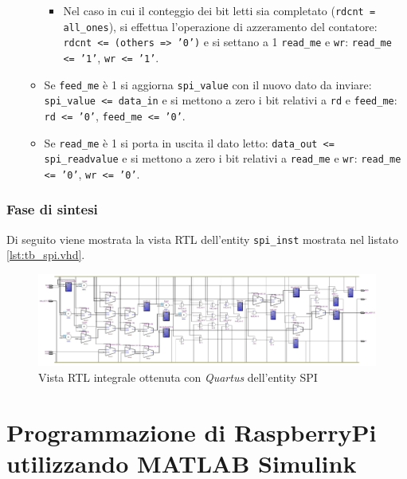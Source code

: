 \documentclass[titlepage]{report}
\begin{document}
\begin{itemize}
\begin{itemize}
\begin{itemize}
						\item Nel caso in cui il conteggio dei bit letti sia completato (\texttt{rdcnt = all\_ones}), si effettua l'operazione di azzeramento del contatore: \texttt{rdcnt <= (others => '0')} e si settano a 1 \texttt{read\_me} e \texttt{wr}: \texttt{read\_me <= '1'}, \texttt{wr <= '1'}.
					\end{itemize}
					\item Se \texttt{feed\_me} è 1 si aggiorna \texttt{spi\_value} con il nuovo dato da inviare: \texttt{spi\_value <= data\_in} e si mettono a zero i bit relativi a \texttt{rd} e \texttt{feed\_me}: \texttt{rd <= '0'}, \texttt{feed\_me <= '0'}.
					\item Se \texttt{read\_me} è 1 si porta in uscita il dato letto: \texttt{data\_out <= spi\_readvalue} e si mettono a zero i bit relativi a \texttt{read\_me} e \texttt{wr}: \texttt{read\_me <= '0'}, \texttt{wr <= '0'}.
				\end{itemize}
			\end{itemize}

		\subsection*{Fase di sintesi}
		\label{subsec:spi_sintesi}
			Di seguito viene mostrata la vista RTL dell'entity \texttt{spi\_inst} mostrata nel listato \ref{lst:tb_spi.vhd}.

			\begin{figure}[H]
				\centering
				\includegraphics[scale=0.21]{./img/spi_spi_inst.jpg}
				\caption{Vista RTL integrale ottenuta con \textit{Quartus} dell'entity SPI}
				\label{fig:rtl_quartus_spi}
			\end{figure}	
\chapter*{Programmazione di RaspberryPi utilizzando MATLAB Simulink}
\label{ch:programmazione_raspberrypi}
\end{document}
